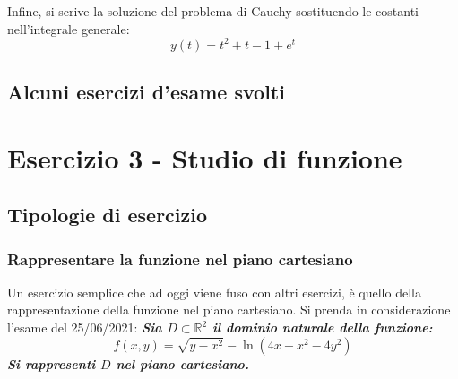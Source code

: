\documentclass[a4paper]{article}
\begin{document}
	Infine, si scrive la soluzione del problema di Cauchy sostituendo le costanti nell'integrale generale:
	\begin{equation*}
		y\left(t\right) = t^{2} + t -1 + e^{t}
	\end{equation*}\newpage

	\subsection{Alcuni esercizi d'esame svolti}
	\newpage

	\section{Esercizio 3 - Studio di funzione}

	\subsection{Tipologie di esercizio}

	\subsubsection{Rappresentare la funzione nel piano cartesiano}\label{par: rappresentare la funzione nel piano cartesiano}

	Un esercizio semplice che ad oggi viene fuso con altri esercizi, è quello della rappresentazione della funzione nel piano cartesiano. Si prenda in considerazione l'esame del 25/06/2021: \textcolor{Green4}{\textbf{\emph{Sia $D\subset\mathbb{R}^{2}$ il dominio naturale della funzione:}}
	\begin{equation*}
		f\left(x,y\right) = \sqrt{y-x^{2}}-\ln\left(4x-x^{2}-4y^{2}\right)
	\end{equation*}
	\textbf{\emph{Si rappresenti $D$ nel piano cartesiano.}}}\newline
\end{document}
